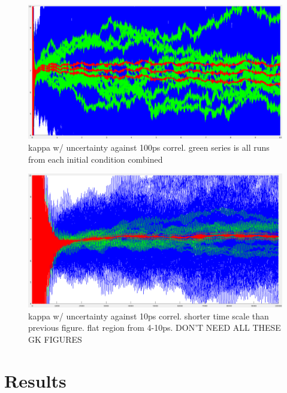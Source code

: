 \documentclass[%
preprint,                                  %
nofootinbib,
 amsmath,amssymb,
 aps,
]{revtex4-1}
\begin{document}
\begin{figure}[h!]
  \includegraphics[width=\linewidth]{images/6x6x4_01-z-stddev.png}
  \caption{kappa w/ uncertainty against 100ps correl. green series is all runs from each initial condition combined}
  \label{fig:664z_100ps}
\end{figure}

\begin{figure}[h!]
  \includegraphics[width=\linewidth]{images/6x6x4_01-z-stddev_2-10ps.png}
  \caption{kappa w/ uncertainty against 10ps correl. shorter time scale than previous figure. flat region from 4-10ps. DON'T NEED ALL THESE GK FIGURES}
  \label{fig:664z_10ps}
\end{figure}
















\section{\label{sec:results}Results}
\end{document}

